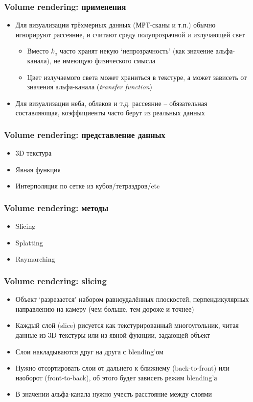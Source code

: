 \documentclass[10pt]{beamer}
\begin{document}
\begin{frame}[fragile]
\frametitle{Volume rendering: применения}
\begin{itemize}
\item Для визуализации трёхмерных данных (МРТ-сканы и т.п.) обычно игнорируют рассеяние, и считают среду полупрозрачной и излучающей свет
\pause
\begin{itemize}
\item Вместо \begin{math}k_a\end{math} часто хранят некую `непрозрачность' (как значение альфа-канала), не имеющую физического смысла
\pause
\item Цвет излучаемого света может храниться в текстуре, а может зависеть от значения альфа-канала (\textit{transfer function})
\end{itemize}
\pause
\item Для визуализации неба, облаков и т.д. рассеяние -- обязательная составляющая, коэффициенты часто берут из реальных данных
\end{itemize}
\end{frame}

\begin{frame}[fragile]
\frametitle{Volume rendering: представление данных}
\begin{itemize}
\item 3D текстура
\pause
\item Явная функция
\pause
\item Интерполяция по сетке из кубов/тетраэдров/etc
\end{itemize}
\end{frame}

\begin{frame}[fragile]
\frametitle{Volume rendering: методы}
\begin{itemize}
\item Slicing
\item Splatting
\item Raymarching
\end{itemize}
\end{frame}

\begin{frame}[fragile]
\frametitle{Volume rendering: slicing}
\begin{itemize}
\item Объект `разрезается' набором равноудалённых плоскостей, перпендикулярных направлению на камеру (чем больше, тем дороже и точнее)
\pause
\item Каждый слой (slice) рисуется как текстурированный многоугольник, читая данные из 3D текстуры или из явной фукнции, задающей объект
\pause
\item Слои накладываются друг на друга с blending'ом
\pause
\item Нужно отсортировать слои от дальнего к ближнему (back-to-front) или наоборот (front-to-back), об этого будет зависеть режим blending'а
\pause
\item В значении альфа-канала нужно учесть расстояние между слоями
\end{itemize}
\end{frame}
\end{document}
